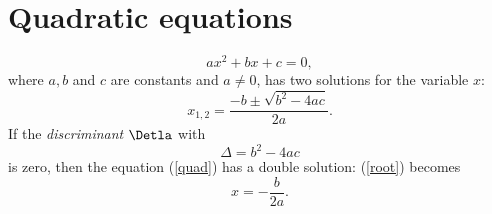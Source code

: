 \documentclass{article}
\begin{document}
\section*{Quadratic equations}  %


\begin{equation}
  \label{quad}
  ax^2 + bx + c = 0,
\end{equation}
where \( a, b\) and \( c \) are constants and \( a \neq 0 \),
has two solutions for the variable \( x \):
\begin{equation}
  \label{root}
  x_{1,2} = \frac{-b \pm \sqrt{b^2 -4ac}}{2a}.
\end{equation}
If the \emph{discriminant} \( \Detla \) with
\[ \Delta = b^2 - 4ac \]
is zero, then the equation (\ref{quad}) has a double solution:
(\ref{root}) becomes
\[ x = - \frac{b}{2a}. \]
\end{document}
